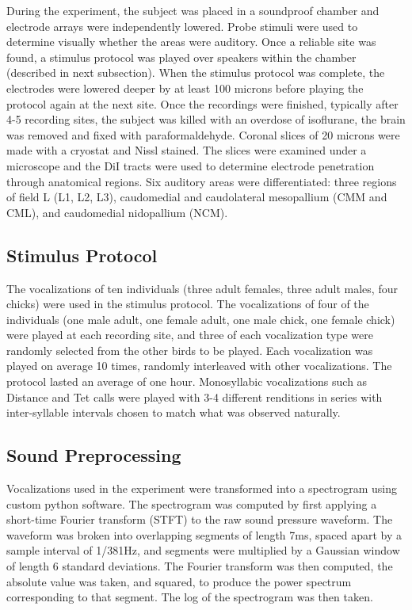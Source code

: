     During the experiment, the subject was placed in a soundproof chamber and electrode arrays were independently lowered. Probe stimuli were used to determine visually whether the areas were auditory. Once a reliable site was found, a stimulus protocol was played over speakers within the chamber (described in next subsection). When the stimulus protocol was complete, the electrodes were lowered deeper by at least 100 microns before playing the protocol again at the next site.
Once the recordings were finished, typically after 4-5 recording sites, the subject was killed with an overdose of isoflurane, the brain was removed and fixed with paraformaldehyde. Coronal slices of 20 microns were made with a cryostat and Nissl stained. The slices were examined under a microscope and the DiI tracts were used to determine electrode penetration through anatomical regions. Six auditory areas were differentiated: three regions of field L (L1, L2, L3), caudomedial and caudolateral mesopallium (CMM and CML), and caudomedial nidopallium (NCM).

\subsection{Stimulus Protocol}

    The vocalizations of ten individuals (three adult females, three adult males, four chicks) were used in the stimulus protocol. The vocalizations of four of the individuals (one male adult, one female adult, one male chick, one female chick) were played at each recording site, and three of each vocalization type were randomly selected from the other birds to be played. Each vocalization was played on average 10 times, randomly interleaved with other vocalizations. The protocol lasted an average of one hour. Monosyllabic vocalizations such as Distance and Tet calls were played with 3-4 different renditions in series with inter-syllable intervals chosen to match what was observed naturally.

\subsection{Sound Preprocessing}

Vocalizations used in the experiment were transformed into a spectrogram using custom python software. The spectrogram was computed by first applying a short-time Fourier transform (STFT) to the raw sound pressure waveform. The waveform was broken into overlapping segments of length 7ms, spaced apart by a sample interval of 1/381Hz, and segments were multiplied by a Gaussian window of length 6 standard deviations. The Fourier transform was then computed, the absolute value was taken, and squared, to produce the power spectrum corresponding to that segment. The log of the spectrogram was then taken.

